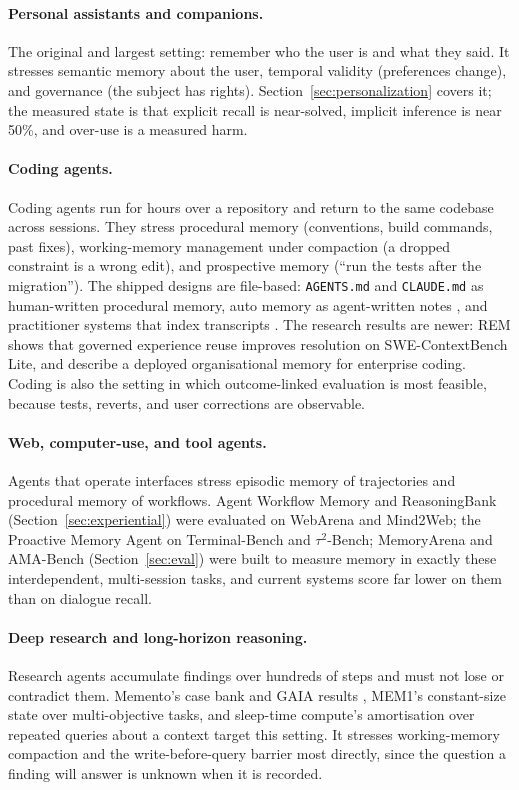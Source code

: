 \documentclass[11pt]{article}
\begin{document}
\paragraph{Personal assistants and companions.} The original and largest setting: remember who the user is and what they said. It stresses semantic memory about the user, temporal validity (preferences change), and governance (the subject has rights). Section~\ref{sec:personalization} covers it; the measured state is that explicit recall is near-solved, implicit inference is near 50\%, and over-use is a measured harm.

\paragraph{Coding agents.} Coding agents run for hours over a repository and return to the same codebase across sessions. They stress procedural memory (conventions, build commands, past fixes), working-memory management under compaction (a dropped constraint is a wrong edit), and prospective memory (``run the tests after the migration''). The shipped designs are file-based: \texttt{AGENTS.md} and \texttt{CLAUDE.md} as human-written procedural memory, auto memory as agent-written notes \citep{anthropic2026claudecode}, and practitioner systems that index transcripts \citep{akita2026}. The research results are newer: REM \citep{chen2026rem} shows that governed experience reuse improves resolution on SWE-ContextBench Lite, and \citet{dhanyamraju2026orgmemory} describe a deployed organisational memory for enterprise coding. Coding is also the setting in which outcome-linked evaluation is most feasible, because tests, reverts, and user corrections are observable.

\paragraph{Web, computer-use, and tool agents.} Agents that operate interfaces stress episodic memory of trajectories and procedural memory of workflows. Agent Workflow Memory and ReasoningBank (Section~\ref{sec:experiential}) were evaluated on WebArena and Mind2Web; the Proactive Memory Agent on Terminal-Bench and $\tau^2$-Bench; MemoryArena and AMA-Bench (Section~\ref{sec:eval}) were built to measure memory in exactly these interdependent, multi-session tasks, and current systems score far lower on them than on dialogue recall.

\paragraph{Deep research and long-horizon reasoning.} Research agents accumulate findings over hundreds of steps and must not lose or contradict them. Memento's case bank and GAIA results \citep{zhou2025memento}, MEM1's constant-size state over multi-objective tasks, and sleep-time compute's amortisation over repeated queries about a context \citep{lin2025sleeptime} target this setting. It stresses working-memory compaction and the write-before-query barrier most directly, since the question a finding will answer is unknown when it is recorded.
\end{document}

